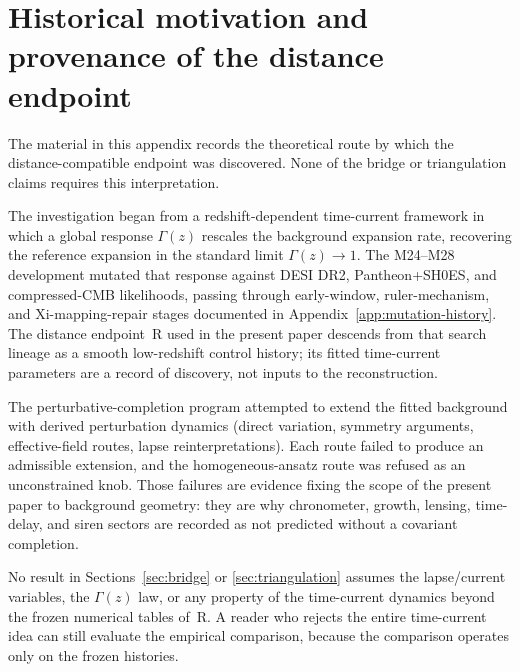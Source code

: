 \section{Historical motivation and provenance of the distance endpoint}
\label{app:time-current}

The material in this appendix records the theoretical route by which
the distance-compatible endpoint was discovered. None of the bridge or
triangulation claims requires this interpretation.

The investigation began from a redshift-dependent time-current
framework in which a global response $\Gamma(z)$ rescales the
background expansion rate, recovering the reference expansion in the
standard limit $\Gamma(z)\to 1$. The M24--M28 development mutated
that response against DESI DR2, Pantheon+SH0ES, and compressed-CMB
likelihoods, passing through early-window, ruler-mechanism, and
Xi-mapping-repair stages documented in
Appendix~\ref{app:mutation-history}. The distance endpoint~R used in
the present paper descends from that search lineage as a smooth
low-redshift control history; its fitted time-current parameters are
a record of discovery, not inputs to the reconstruction.

The perturbative-completion program attempted to extend the fitted
background with derived perturbation dynamics (direct variation,
symmetry arguments, effective-field routes, lapse
reinterpretations). Each route failed to produce an admissible
extension, and the homogeneous-ansatz route was refused as an
unconstrained knob. Those failures are evidence fixing the scope of
the present paper to background geometry: they are why chronometer,
growth, lensing, time-delay, and siren sectors are recorded as not
predicted without a covariant completion.

No result in Sections~\ref{sec:bridge} or \ref{sec:triangulation}
assumes the lapse/current variables, the $\Gamma(z)$ law, or any
property of the time-current dynamics beyond the frozen numerical
tables of~R. A reader who rejects the entire time-current idea can
still evaluate the empirical comparison, because the comparison
operates only on the frozen histories.

